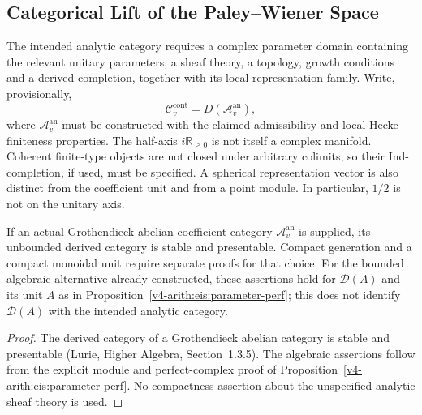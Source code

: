 \subsection{Categorical Lift of the Paley--Wiener Space}

\begin{definition}
\label{v4-arith:w6-d:def:C-cont-local}
The intended analytic category requires a complex parameter domain
containing the relevant unitary parameters, a sheaf theory, a topology,
growth conditions and a derived completion, together with its local
representation family. Write, provisionally,
\begin{equation}
\label{v4-arith:w6-d:eq:C-cont-local}
 \mathcal C_v^{\mathrm{cont}}=D(\mathcal A_v^{\mathrm{an}}),
\end{equation}
where $\mathcal A_v^{\mathrm{an}}$ must be constructed with the claimed
admissibility and local Hecke-finiteness properties. The half-axis
$i\mathbb R_{\ge0}$ is not itself a complex manifold. Coherent
finite-type objects are not closed under arbitrary colimits, so their
Ind-completion, if used, must be specified. A spherical representation
vector is also distinct from the coefficient unit and from a point
module. In particular, $1/2$ is not on the unitary axis.
\end{definition}
\begin{proposition}
\label{v4-arith:w6-d:prop:C-cont-stable-pres}
If an actual Grothendieck abelian coefficient category
$\mathcal A_v^{\mathrm{an}}$ is supplied, its unbounded derived
category is stable and presentable. Compact generation and a compact
monoidal unit require separate proofs for that choice. For the bounded
algebraic alternative already constructed, these assertions hold for
$\mathcal D(A)$ and its unit $A$ as in
Proposition~\ref{v4-arith:eis:parameter-perf}; this does not identify
$\mathcal D(A)$ with the intended analytic category.
\end{proposition}
\begin{proof}
The derived category of a Grothendieck abelian category is stable and
presentable (Lurie, Higher Algebra, Section~1.3.5). The algebraic
assertions follow from the explicit module and perfect-complex proof
of Proposition~\ref{v4-arith:eis:parameter-perf}. No compactness
assertion about the unspecified analytic sheaf theory is used.
\end{proof}


